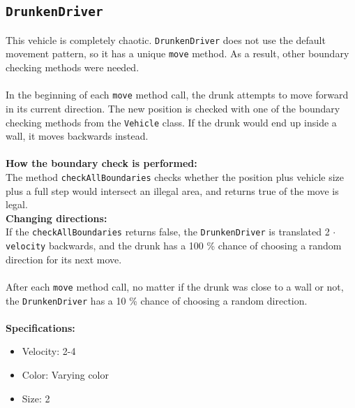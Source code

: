 \subsection{\texttt{DrunkenDriver}}
This vehicle is completely chaotic. \texttt{DrunkenDriver} does not use the default movement pattern, so it has a unique \texttt{move} method. As a result, other boundary checking methods were needed.\\
\\
In the beginning of each \texttt{move} method call, the drunk attempts to move forward in its current direction. The new position is checked with one of the boundary checking methods from the \texttt{Vehicle} class. If the drunk would end up inside a wall, it moves backwards instead.\\
\\
\textbf{How the boundary check is performed:}\\
The method \texttt{checkAllBoundaries} checks whether the position plus vehicle size plus a full step would intersect an illegal area, and returns true of the move is legal. \\

\textbf{Changing directions:}\\
If the \texttt{checkAllBoundaries} returns false, the \texttt{DrunkenDriver} is translated 2 $\cdot$ \texttt{velocity} backwards, and the drunk has a 100 \% chance of choosing a random direction for its next move.\\
\\
After each \texttt{move} method call, no matter if the drunk was close to a wall or not, the \texttt{DrunkenDriver} has a 10 \% chance of choosing a random direction.\\
\\
\textbf{Specifications:}
\begin{itemize}
    \item Velocity: 2-4
    \item Color: Varying color
    \item Size: 2
\end{itemize}



